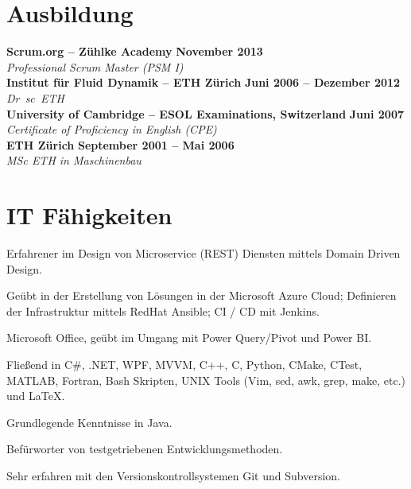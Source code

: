 \documentclass[line,11pt,a4paper]{../resume}
\begin{document}
\begin{resume}
\section{\mysidestyle Ausbildung}\vspace{2mm}

\textbf{Scrum.org -- Zühlke Academy} \hfill \textbf{November 2013}\\
\vspace{1mm}%
\textsl{Professional Scrum Master (PSM I)}\\
\vspace{-1mm}%
%
\textbf{Institut für Fluid Dynamik -- ETH Zürich}
  \hfill \textbf{Juni 2006 -- Dezember 2012}\\
\vspace{1mm}%
\textsl{Dr\ sc\ ETH}\\
\vspace{-1mm}%
%
\textbf{University of Cambridge -- ESOL Examinations, Switzerland}
  \hfill \textbf{Juni 2007}\\
\vspace{1mm}%
\textsl{Certificate of Proficiency in English (CPE)}\\
\vspace{-1mm}%
%
\textbf{ETH Zürich} \hfill \textbf{September 2001 -- Mai 2006}\\
\vspace{1mm}%
\textsl{MSc ETH in Maschinenbau}

\section{\mysidestyle IT Fähigkeiten}\vspace{6mm}
\begin{list2}
  \item Erfahrener im Design von Microservice (REST) Diensten mittels Domain
    Driven Design.
  \item Geübt in der Erstellung von Lösungen in der Microsoft Azure Cloud;
    Definieren der Infrastruktur mittels RedHat Ansible; CI / CD mit Jenkins.
  \item Microsoft Office, geübt im Umgang mit Power Query/Pivot und Power BI.
  \item Flie{\ss}end in C\#, .NET, WPF, MVVM, C++, C, Python, CMake, CTest,
    MATLAB, Fortran, Bash Skripten, UNIX Tools (Vim, sed, awk, grep, make,
    etc.) und {\selectfont\LaTeX}.
  \item Grundlegende Kenntnisse in Java.
  \item Befürworter von testgetriebenen Entwicklungsmethoden.
  \item Sehr erfahren mit den Versionskontrollsystemen Git und Subversion.
\end{list2}


\end{resume}
\end{document}
